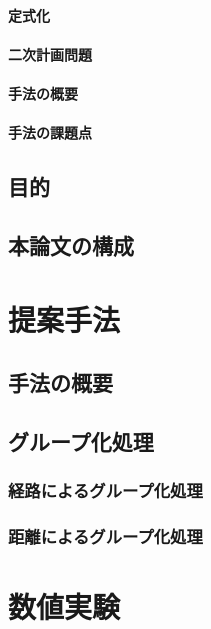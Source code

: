 \subsubsection{定式化}

\subsubsection{二次計画問題}

\subsubsection{手法の概要}

\subsubsection{手法の課題点}

\section{目的}

\section{本論文の構成}

\chapter{提案手法}

\section{手法の概要}

\section{グループ化処理}

\subsection{経路によるグループ化処理}

\subsection{距離によるグループ化処理}

\chapter{数値実験}

